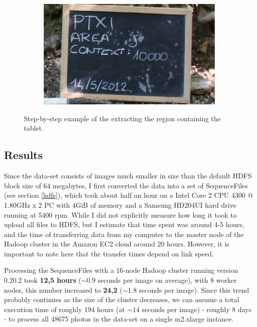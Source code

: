 \documentclass [12pt,a4paper]{report}
\begin{document}
\begin{figure}[h]
\begin{subfigure}{.5\textwidth}
	\caption{}
	\label{fig_bounding_box_small}
\end{subfigure}
\\
\begin{subfigure}{1.0\textwidth}
  \centering
  \includegraphics[scale=0.27]{box_extracted.eps} %
  \caption{}
	\label{fig_box_extracted_small}
\end{subfigure}
\caption[Step-by-step example of region extraction]{Step-by-step example of the extracting the region containing the tablet.}
\label{fig_pipeline_examples}
\end{figure}

\subsection{Results}
Since the data-set consists of images much smaller in size than the default HDFS block size of 64 megabytes, I first converted the data into a set of SequenceFiles (see section \ref{hdfs}), which took about half an hour on a Intel Core 2 CPU 4300 @ 1.80GHz x 2 PC with 4GiB of memory and a Samsung HD204UI hard drive running at 5400 rpm. While I did not explicitly measure how long it took to upload all files to HDFS, but I estimate that time spent was around 4-5 hours, and the time of transferring data from my computer to the master node of the Hadoop cluster in the Amazon EC2 cloud around 20 hours. However, it is important to note here that the transfer times depend on link speed. 

Processing the SequenceFiles with a 16-node Hadoop cluster running version 0.20.2 took \textbf{12,5 hours} ($\sim0.9$ seconds per image on average), with 8 worker nodes, this number increased to \textbf{24,2} ($\sim1.8$ seconds per image). Since this trend probably continues as the size of the cluster decreases, we can assume a total execution time of roughly 194 hours (at $\sim14$ seconds per image) - roughly 8 days - to process all 48675 photos in the data-set on a single m2.xlarge instance. 
\end{document}
